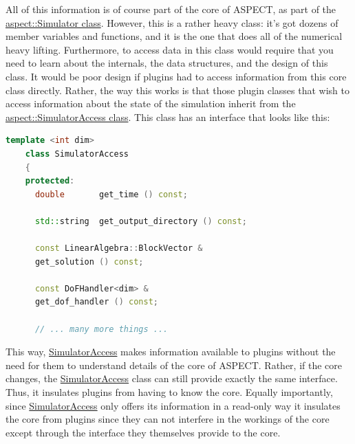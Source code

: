 \documentclass{article}
\newcommand{\aspect}{\textsc{ASPECT}}
\begin{document}
All of this information is of course part of the core of \aspect{},
as part of the
\href{doc/doxygen/classaspect_1_1Simulator.html}{aspect::Simulator
class}. However, this is a rather heavy class: it's got dozens of
member variables and functions, and it is the one that does all
of the numerical heavy lifting. Furthermore, to access data in
this class would require that you need to learn about the internals,
the data structures, and the design of this class.
It would be poor design if plugins had to access information from this
core class directly. Rather, the way this works is that those plugin
classes that wish to access information about the state of the simulation
inherit from the
\href{doc/doxygen/classaspect_1_1SimulatorAccess.html}{aspect::SimulatorAccess
class}. This class has an interface that looks like this:
\begin{lstlisting}[frame=single,language=C++]
    template <int dim>
    class SimulatorAccess
    {
    protected:
      double       get_time () const;

      std::string  get_output_directory () const;

      const LinearAlgebra::BlockVector &
      get_solution () const;

      const DoFHandler<dim> &
      get_dof_handler () const;

      // ... many more things ...
\end{lstlisting}
This way, \href{doc/doxygen/classaspect_1_1SimulatorAccess.html}{SimulatorAccess} makes information available to plugins
without the need for them to understand details of the core of \aspect{}.
Rather, if the core changes, the \href{doc/doxygen/classaspect_1_1SimulatorAccess.html}{SimulatorAccess} class can still
provide exactly the same interface. Thus, it insulates plugins from having
to know the core. Equally importantly, since \href{doc/doxygen/classaspect_1_1SimulatorAccess.html}{SimulatorAccess} only
offers its information in a read-only way it insulates the core from
plugins since they can not interfere in the workings of the core except
through the interface they themselves provide to the core.
\end{document}
